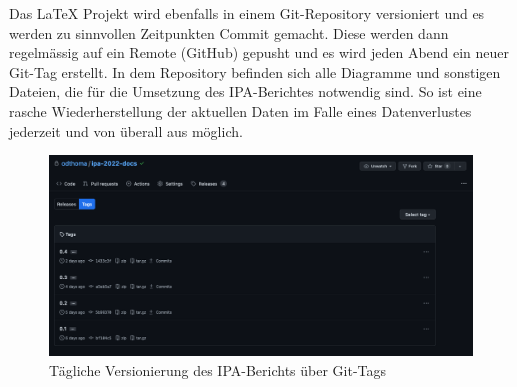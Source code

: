 Das LaTeX Projekt wird ebenfalls in einem Git-Repository versioniert und es werden zu sinnvollen Zeitpunkten Commit gemacht. Diese werden dann regelmässig auf ein Remote (GitHub) gepusht und es wird jeden Abend ein neuer Git-Tag erstellt.
In dem Repository befinden sich alle Diagramme und sonstigen Dateien, die für die Umsetzung des IPA-Berichtes notwendig sind.
So ist eine rasche Wiederherstellung der aktuellen Daten im Falle eines Datenverlustes jederzeit und von überall aus möglich.

\begin{figure}[H]
    \centering
    \includegraphics[width=14cm]{images/latex-github-tags.png}
    \caption{\label{fig:latex-github-tags}Tägliche Versionierung des IPA-Berichts über Git-Tags}
\end{figure}
